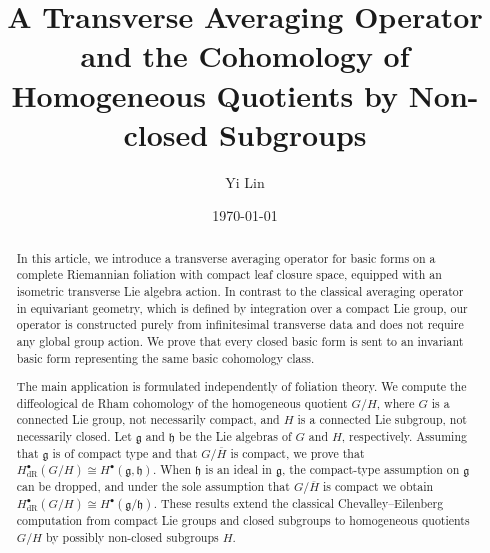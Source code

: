 \documentclass[reqno, 11pt]{amsart}
\theoremstyle{definition}
\theoremstyle{property}
\theoremstyle{remark}
\numberwithin{equation}{section}
\begin{document}
\title[A Transverse Averaging Operator and Cohomology of G/H]
{A Transverse Averaging Operator and the Cohomology of Homogeneous Quotients by Non-closed Subgroups}
\author{Yi Lin}

\address{Y. Lin \\
Department of Mathematical Sciences \\
Georgia Southern University \\
Statesboro, GA, 30460 USA}


\date{\today}


\begin{abstract}

In this article, we introduce a transverse averaging operator for basic forms
on a complete Riemannian foliation with compact leaf closure space, equipped
with an isometric transverse Lie algebra action. In contrast to the classical
averaging operator in equivariant geometry, which is defined by integration
over a compact Lie group, our operator is constructed purely from
infinitesimal transverse data and does not require any global group action. We
prove that every closed basic form is sent to an invariant basic form
representing the same basic cohomology class. 


The main application is formulated independently of foliation theory. We
compute the diffeological de Rham cohomology of the homogeneous quotient
$G/H$, where $G$ is a connected Lie group, not necessarily compact, and $H$
is a connected Lie subgroup, not necessarily closed. Let $\mathfrak g$ and
$\mathfrak h$ be the Lie algebras of $G$ and $H$, respectively. Assuming that
$\mathfrak g$ is of compact type and that $G/\overline{H}$ is compact, we
prove that
$
H^\bullet_{\mathrm{dR}}(G/H)
\cong
H^\bullet(\mathfrak g,\mathfrak h)$.
When $\mathfrak h$ is an ideal in $\mathfrak g$, the compact-type assumption
on $\mathfrak g$ can be dropped, and under the sole assumption that
$G/\overline{H}$ is compact we obtain
$
H^\bullet_{\mathrm{dR}}(G/H)
\cong
H^\bullet(\mathfrak g/\mathfrak h)$. 
These results extend the classical Chevalley--Eilenberg computation from
compact Lie groups and closed subgroups to homogeneous quotients $G/H$ by possibly
non-closed subgroups $H$.

\end{abstract}
\end{document}
